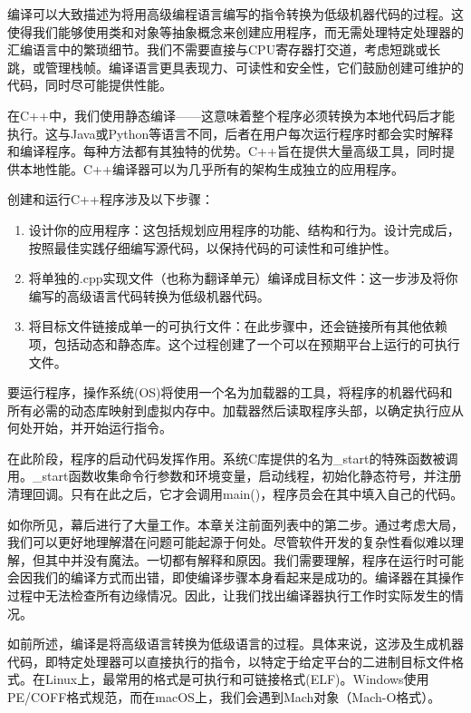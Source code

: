 
编译可以大致描述为将用高级编程语言编写的指令转换为低级机器代码的过程。这使得我们能够使用类和对象等抽象概念来创建应用程序，而无需处理特定处理器的汇编语言中的繁琐细节。我们不需要直接与CPU寄存器打交道，考虑短跳或长跳，或管理栈帧。编译语言更具表现力、可读性和安全性，它们鼓励创建可维护的代码，同时尽可能提供性能。

在C++中，我们使用静态编译——这意味着整个程序必须转换为本地代码后才能执行。这与Java或Python等语言不同，后者在用户每次运行程序时都会实时解释和编译程序。每种方法都有其独特的优势。C++旨在提供大量高级工具，同时提供本地性能。C++编译器可以为几乎所有的架构生成独立的应用程序。

创建和运行C++程序涉及以下步骤：

\begin{enumerate}
\item
设计你的应用程序：这包括规划应用程序的功能、结构和行为。设计完成后，按照最佳实践仔细编写源代码，以保持代码的可读性和可维护性。

\item
将单独的.cpp实现文件（也称为翻译单元）编译成目标文件：这一步涉及将你编写的高级语言代码转换为低级机器代码。

\item
将目标文件链接成单一的可执行文件：在此步骤中，还会链接所有其他依赖项，包括动态和静态库。这个过程创建了一个可以在预期平台上运行的可执行文件。
\end{enumerate}

要运行程序，操作系统(OS)将使用一个名为加载器的工具，将程序的机器代码和所有必需的动态库映射到虚拟内存中。加载器然后读取程序头部，以确定执行应从何处开始，并开始运行指令。

在此阶段，程序的启动代码发挥作用。系统C库提供的名为\_start的特殊函数被调用。\_start函数收集命令行参数和环境变量，启动线程，初始化静态符号，并注册清理回调。只有在此之后，它才会调用main()，程序员会在其中填入自己的代码。

如你所见，幕后进行了大量工作。本章关注前面列表中的第二步。通过考虑大局，我们可以更好地理解潜在问题可能起源于何处。尽管软件开发的复杂性看似难以理解，但其中并没有魔法。一切都有解释和原因。我们需要理解，程序在运行时可能会因我们的编译方式而出错，即使编译步骤本身看起来是成功的。编译器在其操作过程中无法检查所有边缘情况。因此，让我们找出编译器执行工作时实际发生的情况。


如前所述，编译是将高级语言转换为低级语言的过程。具体来说，这涉及生成机器代码，即特定处理器可以直接执行的指令，以特定于给定平台的二进制目标文件格式。在Linux上，最常用的格式是可执行和可链接格式(ELF)。Windows使用PE/COFF格式规范，而在macOS上，我们会遇到Mach对象（Mach-O格式）。

